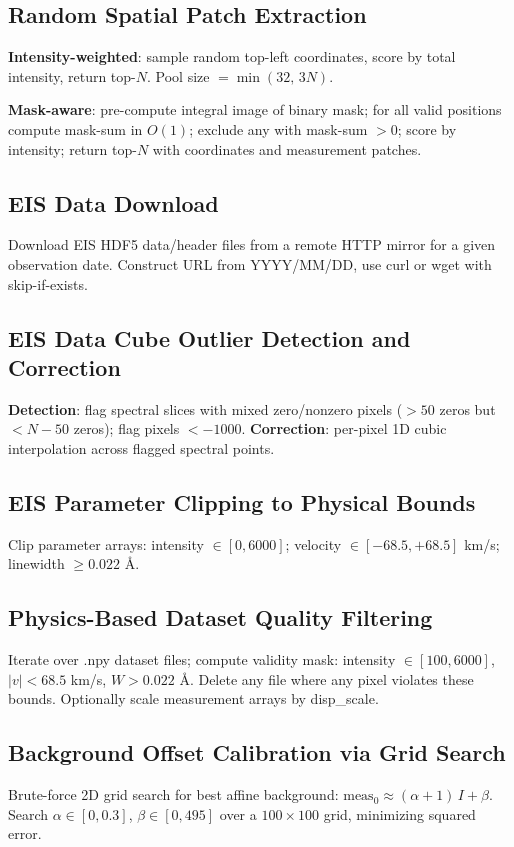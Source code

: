 \documentclass[11pt,a4paper]{article}
\begin{document}
\subsection{Random Spatial Patch Extraction}
\textbf{Intensity-weighted}: sample random top-left coordinates, score by total intensity, return top-$N$. Pool size $= \min(32,\,3N)$.

\textbf{Mask-aware}: pre-compute integral image of binary mask; for all valid positions compute mask-sum in $O(1)$; exclude any with mask-sum $>0$; score by intensity; return top-$N$ with coordinates and measurement patches.

\subsection{EIS Data Download}
Download EIS HDF5 data/header files from a remote HTTP mirror for a given observation date. Construct URL from YYYY/MM/DD, use curl or wget with skip-if-exists.

\subsection{EIS Data Cube Outlier Detection and Correction}
\textbf{Detection}: flag spectral slices with mixed zero/nonzero pixels ($>50$ zeros but $<N-50$ zeros); flag pixels $<-1000$. \textbf{Correction}: per-pixel 1D cubic interpolation across flagged spectral points.

\subsection{EIS Parameter Clipping to Physical Bounds}
Clip parameter arrays: intensity $\in [0, 6000]$; velocity $\in [-68.5, +68.5]$ km/s; linewidth $\geq 0.022$ \AA.

\subsection{Physics-Based Dataset Quality Filtering}
Iterate over .npy dataset files; compute validity mask: intensity $\in [100, 6000]$, $|v| < 68.5$ km/s, $W > 0.022$ \AA. Delete any file where any pixel violates these bounds. Optionally scale measurement arrays by disp\_scale.

\subsection{Background Offset Calibration via Grid Search}
Brute-force 2D grid search for best affine background: $\text{meas}_0 \approx (\alpha+1)\,I + \beta$. Search $\alpha \in [0, 0.3]$, $\beta \in [0, 495]$ over a $100\times100$ grid, minimizing squared error.
\end{document}
